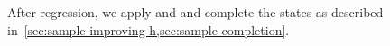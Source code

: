 \documentclass[ppgc,diss,english]{iiufrgs}
\begin{document}
%
%

After regression, we apply \sai and \sui and complete the states as described in~\cref{sec:sample-improving-h,sec:sample-completion}.


%
%
\end{document}
